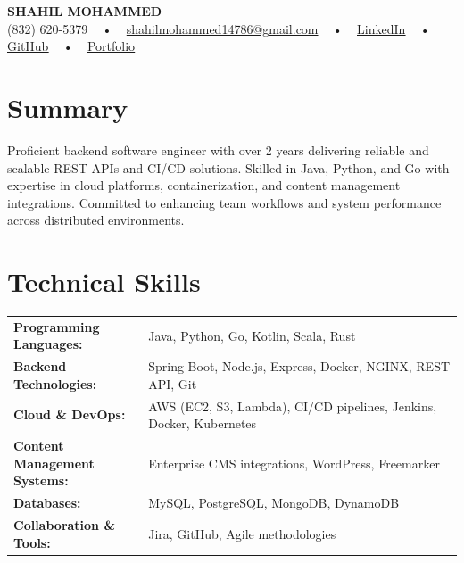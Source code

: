 \documentclass[letterpaper,11pt]{article}
\begin{document}
\begin{center}
    {\fontsize{14pt}{12pt}\selectfont \textbf{\MakeUppercase{Shahil Mohammed}}}\\ \vspace{2pt}
    \fontsize{10pt}{12pt}\selectfont (832) 620-5379 ~ • ~ \href{mailto:shahilmohammed14786@gmail.com}{shahilmohammed14786@gmail.com} ~ • ~  
    \href{https://www.linkedin.com/in/shahil-mohammed-9652931a1/}{\color{blue}\underline{LinkedIn}}  ~ • ~ 
    \href{https://github.com/freakbeast14}{\color{blue}\underline{GitHub}} ~ • ~ 
    \href{https://shahil-mohammed.netlify.app/}{\color{blue}\underline{Portfolio}}
    \vspace{-8pt}
\end{center}

\section{Summary}
\fontsize{9pt}{10pt}\selectfont
Proficient backend software engineer with over 2 years delivering reliable and scalable REST APIs and CI/CD solutions. Skilled in Java, Python, and Go with expertise in cloud platforms, containerization, and content management integrations. Committed to enhancing team workflows and system performance across distributed environments.
 \vspace{-5pt}
 
\section{Technical Skills}
        \vspace{-14pt}
        \begin{table}[h]
            \fontsize{9pt}{10pt}\selectfont
            \begin{tabular}{p{0.3\linewidth} p{0.7\linewidth}}
                \textbf{Programming Languages:} & Java, Python, Go, Kotlin, Scala, Rust \\
                \textbf{Backend Technologies:} & Spring Boot, Node.js, Express, Docker, NGINX, REST API, Git \\
                \textbf{Cloud \& DevOps:} & AWS (EC2, S3, Lambda), CI/CD pipelines, Jenkins, Docker, Kubernetes \\
                \textbf{Content Management Systems:} & Enterprise CMS integrations, WordPress, Freemarker \\
                \textbf{Databases:} & MySQL, PostgreSQL, MongoDB, DynamoDB \\
                \textbf{Collaboration \& Tools:} & Jira, GitHub, Agile methodologies \\
            \end{tabular}
        \end{table}
 \vspace{-15pt}
 
\end{document}
